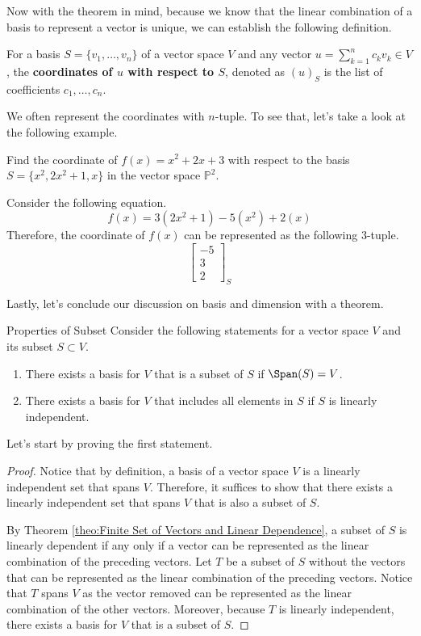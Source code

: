 \documentclass[../main.tex]{subfiles}
\begin{document}
Now with the theorem in mind, because we know that the linear
combination of a basis to represent a vector is unique, we can
establish the following definition.

\begin{definition}
For a basis $S = \{ v_1, \ldots, v_n \}$ of a vector space $V$
and any vector $u = \sum_{k=1}^n c_k v_k \in V$, the
\textbf{coordinates of $u$ with respect to $S$}, denoted as $(u)_S$
is the list of coefficients $c_1, \ldots, c_n$.
\end{definition}

We often represent the coordinates with $n$-tuple. To see that,
let's take a look at the following example.

\begin{problem}
Find the coordinate of $f(x) = x^2 + 2x + 3$ with respect to the
basis $S = \{ x^2, 2x^2 + 1, x \}$ in the vector space $\mathbb{P}^2$.
\end{problem}
\begin{solution}
Consider the following equation.
\[
f(x)
= 3 \left( 2x^2 + 1 \right) - 5 \left( x^2 \right) + 2(x)
\]
Therefore, the coordinate of $f(x)$ can be represented as the
following $3$-tuple.
\[
\begin{bmatrix}
    -5 \\
    3 \\
    2
\end{bmatrix}_S
\]
\end{solution}

Lastly, let's conclude our discussion on basis and dimension with
a theorem.

\begin{theorem}{Properties of Subset}
Consider the following statements for a vector space $V$ and
its subset $S \subset V$.
\begin{enumerate}[noitemsep]
\item
There exists a basis for $V$ that is a subset of $S$ if $\Span(S) =
V$.
\item
There exists a basis for $V$ that includes all elements in $S$ if
$S$ is linearly independent.
\end{enumerate}
\end{theorem}

Let's start by proving the first statement.

\begin{proof}
Notice that by definition, a basis of a vector space $V$ is a linearly
independent set that spans $V$. Therefore, it suffices to show that
there exists a linearly independent set that spans $V$ that is also
a subset of $S$.

By Theorem \ref{theo:Finite Set of Vectors and Linear Dependence},
a subset of $S$ is linearly dependent if any only if a vector can be
represented as the linear combination of the preceding vectors.
Let $T$ be a subset of $S$ without the vectors that can be represented
as the linear combination of the preceding vectors. Notice that $T$
spans $V$ as the vector removed can be represented as the linear
combination of the other vectors. Moreover, because $T$ is linearly
independent, there exists a basis for $V$ that is a subset of $S$.
\end{proof}
\end{document}
